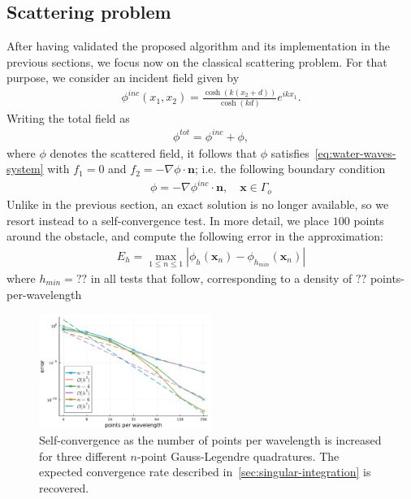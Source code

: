 \documentclass[11pt]{article}
\newcommand{\bn}{\mathbf{n}}
\newcommand{\bx}{\mathbf{x}}
\begin{document}
\subsection{Scattering problem}

After having validated the proposed algorithm and its implementation in the
previous sections, we focus now on the classical scattering problem. For that
purpose, we consider an incident field given by 
\begin{align}
  \phi^{inc}(x_1,x_2) = \frac{\cosh(k(x_2+d))}{\cosh(kd)} e^{i k x_1}.
\end{align}
Writing the total field as 
\begin{align}
  \phi^{tot} = \phi^{inc} + \phi,
\end{align}
where $\phi$ denotes the scattered field, it follows that $\phi$
satisfies~\cref{eq:water-waves-system} with $f_1 = 0$ and $f_2 = -\nabla \phi
\cdot \bn$; i.e. the following boundary condition
\begin{align}
  \phi = - \nabla \phi^{inc} \cdot \bn, \quad \bx \in \Gamma_o
\end{align}
Unlike in the previous section, an exact solution is no longer available,
so we resort instead to a self-convergence test. In more detail, we place $100$
points around the obstacle, and compute the following error in the approximation:
\begin{align}
  E_h = \max_{1 \leq n \leq 1} |\phi_h(\bx_n) - \phi_{h_{min}}(\bx_n) |
\end{align}
where $h_{min} = ??$ in all tests that follow, corresponding to a density of
$??$ points-per-wavelength

\begin{figure}
  \centering
  \includegraphics[width=0.5\textwidth]{figures/scattering_convergence_meshsize_depth_4.pdf}
  \caption{Self-convergence as the number of points per
  wavelength is increased for three different $n$-point Gauss-Legendre
  quadratures. The expected convergence rate described
  in~\cref{sec:singular-integration} is recovered.}
  \label{fig:scattering-convergence}
\end{figure}
\end{document}
